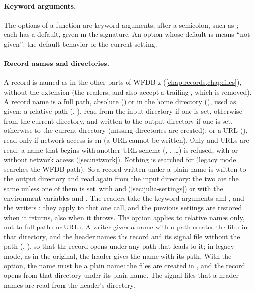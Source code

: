 \paragraph{Keyword arguments.} The options of a function are keyword arguments, after a
semicolon, such as ; each has a
default, given in the signature. An option whose default is  means ``not
given'': the default behavior or the current setting.

\paragraph{Record names and directories.} A record is named as in the other parts of
WFDB-x (\cref{chap:records,chap:files}), without the  extension (the readers,
 and  also accept a trailing ,
which is removed). A record name is a full path, absolute () or in the
home directory (), used as given; a relative path
(, ), read from the input directory if one is set,
otherwise from the current directory, and written to the output directory if one is set,
otherwise to the current directory (missing directories are created); or a URL
(), read only if network access is
on (a URL cannot be written). Only  and  URLs are read: a
name that begins with another URL scheme (, , \ldots) is
refused, with or without network access (\cref{sec:network}). Nothing is searched for
(legacy mode searches the WFDB path). So a record written under a plain name is written
to the output directory and read again from the input directory: the two are the same
unless one of them is set, with  and
 (\cref{sec:julia-settings}) or with the environment
variables  and . The readers take the
keyword arguments  and , and the writers : they
apply to that one call, and the previous settings are restored when it returns, also
when it throws. The  option applies to relative names only, not to full
paths or URLs. A writer given a name with a path creates the files in that directory,
and the header names the record and its signal file without the path (,
), so that the record opens under any path that leads to it; in legacy
mode, as in the original, the header gives the name with its path. With the 
option, the name must be a plain name: the files are created in , and the
record opens from that directory under its plain name. The signal files that a header
names are read from the header's directory.

